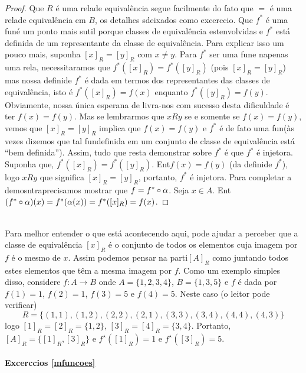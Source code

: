 \begin{proof}
Que $R$ \'e uma rela\cao de equival\^encia segue facilmente do fato que $=$ \'e uma rela\cao de equival\^encia em $B$, os detalhes s\ao deixados como excerc\ih cio. Que $f^{\ast}$ \'e uma fun\cao \'e um ponto mais sutil porque classes de equival\^encia est\ao envolvidas e $f^{\ast}$ est\'a definida de um representante da classe de equival\^encia. Para explicar isso um pouco mais, suponha $[x]_R=[y]_R$ com $x\neq y$. Para $f^{\ast}$ ser uma fun\cao e n\ao apenas uma rela\cao, necessitar\ih amos que $f^{\ast}([x]_R)=f^{\ast}([y]_R)$ (pois $[x]_R=[y]_R$) mas nossa defini\cao de $f^{\ast}$ \'e dada em termos dos representantes das classes de equival\^encia, isto \'e $f^{\ast}([x]_R)=f(x)$ enquanto $f^{\ast}([y]_R)=f(y)$. Obviamente, nossa \'unica esperan\cc a de livra-nos com sucesso desta dificuldade \'e ter $f(x)=f(y)$. Mas se lembrarmos que $xRy$ se e somente se $f(x)=f(y)$, vemos que $[x]_R=[y]_R$ implica que $f(x)=f(y)$ e $f^{\ast}$ \'e de fato uma fun\cao (\`as vezes dizemos que tal fun\cao definida em um conjunto de classe de equival\^encia est\'a ``bem definida''). Assim, tudo que resta demonstrar sobre $f^{\ast}$ \'e que $f^{\ast}$ \'e injetora. Suponha que, $f^{\ast}([x]_R)=f^{\ast}([y]_R)$. Ent\ao $f(x)=f(y)$ (da defini\cao de $f^{\ast}$), logo $xRy$ que significa $[x]_R=[y]_R$, portanto, $f^{\ast}$ \'e injetora. Para completar a demosntra\cao precisamos mostrar que $f=f^{\ast}\circ\alpha$. Seja $x\in A$. Ent\ao $(f^{\ast}\circ\alpha)(x)=f^{\ast}(\alpha(x))=f^{\ast}([x]_R)=f(x)$.
\end{proof}
\\

Para melhor entender o que est\'a acontecendo aqui, pode ajudar a perceber que a classe de equival\^encia $[x]_R$ \'e o conjunto de todos os elementos cuja imagem por $f$ \'e o mesmo de $x$. Assim podemos pensar na parti\cao $[A]_R$ como juntando todos estes elementos que t\^em a mesma imagem por $f$. Como um exemplo simples disso, considere $f:A\to B$ onde $A=\{1,2,3,4\}$, $B=\{1,3,5\}$ e $f$ \'e dada por $f(1)=1$, $f(2)=1$, $f(3)=5$ e $f(4)=5$. Neste caso (o leitor pode verificar)
\[
R=\{(1,1),(1,2),(2,2),(2,1),(3,3),(3,4),(4,4),(4,3)\}
\] 
logo $[1]_R=[2]_R=\{1,2\}$, $[3]_R=[4]_R=\{3,4\}$. Portanto, $[A]_R=\{[1]_R,[3]_R\}$ e $f^{\star}([1]_R)=1$ e $f^{\star}([3]_R)=5$.


\paragraph{Excerc\ih cios \ref{mfuncoes}}

